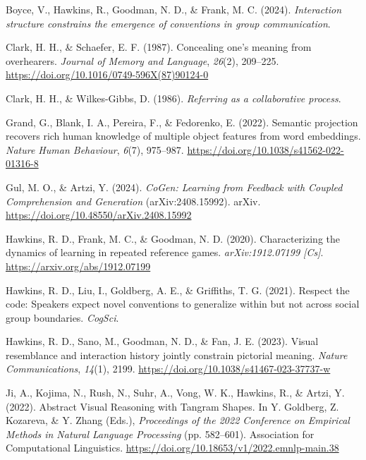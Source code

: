 \documentclass[10pt, letterpaper]{article}
\begin{document}
\label{refs}
\begin{CSLReferences}{1}{0}
Boyce, V., Hawkins, R., Goodman, N. D., \& Frank, M. C. (2024).
\emph{Interaction structure constrains the emergence of conventions in
group communication}.

Clark, H. H., \& Schaefer, E. F. (1987). Concealing one's meaning from
overhearers. \emph{Journal of Memory and Language}, \emph{26}(2),
209--225. \url{https://doi.org/10.1016/0749-596X(87)90124-0}

Clark, H. H., \& Wilkes-Gibbs, D. (1986). \emph{Referring as a
collaborative process}.

Grand, G., Blank, I. A., Pereira, F., \& Fedorenko, E. (2022). Semantic
projection recovers rich human knowledge of multiple object features
from word embeddings. \emph{Nature Human Behaviour}, \emph{6}(7),
975--987. \url{https://doi.org/10.1038/s41562-022-01316-8}

Gul, M. O., \& Artzi, Y. (2024). \emph{{CoGen}: {Learning} from
{Feedback} with {Coupled Comprehension} and {Generation}}
(arXiv:2408.15992). arXiv.
\url{https://doi.org/10.48550/arXiv.2408.15992}

Hawkins, R. D., Frank, M. C., \& Goodman, N. D. (2020). Characterizing
the dynamics of learning in repeated reference games.
\emph{arXiv:1912.07199 {[}Cs{]}}. \url{https://arxiv.org/abs/1912.07199}

Hawkins, R. D., Liu, I., Goldberg, A. E., \& Griffiths, T. G. (2021).
Respect the code: {Speakers} expect novel conventions to generalize
within but not across social group boundaries. \emph{CogSci}.

Hawkins, R. D., Sano, M., Goodman, N. D., \& Fan, J. E. (2023). Visual
resemblance and interaction history jointly constrain pictorial meaning.
\emph{Nature Communications}, \emph{14}(1), 2199.
\url{https://doi.org/10.1038/s41467-023-37737-w}

Ji, A., Kojima, N., Rush, N., Suhr, A., Vong, W. K., Hawkins, R., \&
Artzi, Y. (2022). Abstract {Visual Reasoning} with {Tangram Shapes}. In
Y. Goldberg, Z. Kozareva, \& Y. Zhang (Eds.), \emph{Proceedings of the
2022 {Conference} on {Empirical Methods} in {Natural Language
Processing}} (pp. 582--601). Association for Computational Linguistics.
\url{https://doi.org/10.18653/v1/2022.emnlp-main.38}


\end{CSLReferences}
\end{document}
